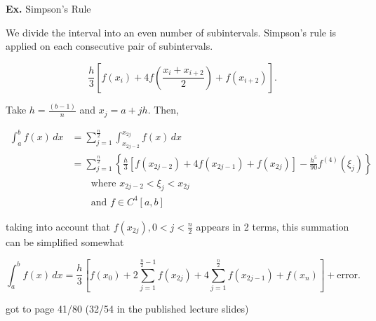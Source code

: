 \documentclass[12pt]{article}
\newcommand{\Ex}{\textbf{Ex.}\xspace}
\begin{document}
\Ex Simpson's Rule

\begin{center}
\end{center}


We divide the interval into an even number of subintervals. Simpson's rule is
applied on each consecutive pair of subintervals.

\[
  \frac{h}{3} \left[f(x_i) + 4f(\frac{x_i+x_{i+2}}{2}) + f(x_{i+2})\right]
.\]

Take $\displaystyle h=\frac{(b-1)}{n}$ and $x_j = a + jh$. Then,

\begin{align*}
  \int_{a}^{b} f(x) \, dx &= \sum_{j=1}^{\frac{n}{2}} \int_{x_{2j-2}}^{x_{2j}}
  f(x) \, dx \\
                          &= \sum_{j=1}^{\frac{n}{2}} \left\{
                            \frac{h}{3} \left[
                              f(x_{2j-2}) + 4f(x_{2j-1}) + f(x_{2j})
                            \right] - \frac{h^5}{90} f^{(4)}(\xi_j)
                          \right\} \\
                          &\qquad\text{where } x_{2j-2} < \xi_j < x_{2j} \\
                          &\qquad\text{and } f \in C^4[a,b]
\end{align*}

taking into account that $f(x_{2j}), 0 < j < \frac{n}{2}$ appears in 2 terms,
this summation can be simplified somewhat

\[
  \int_{a}^{b} f(x) \, dx = \frac{h}{3} \left[
    f(x_0) + 2 \sum_{j=1}^{\frac{n}{2}-1} f(x_{2j}) + 4 \sum_{j=1}^{\frac{n}{2}}
    f(x_{2j-1}) + f(x_n)
  \right] + \text{error}
.\]


got to page 41/80 (32/54 in the published lecture slides)
\end{document}
